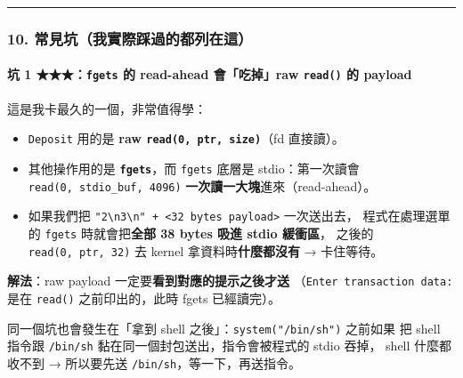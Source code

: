 \documentclass[10pt,a4paper]{article}
\providecommand{\tightlist}{%
  \setlength{\itemsep}{0pt}\setlength{\parskip}{0pt}}
\begin{document}
\begin{center}\rule{0.5\linewidth}{0.5pt}\end{center}

\subsubsection{10.
常見坑（我實際踩過的都列在這）}\label{ux5e38ux898bux5751ux6211ux5be6ux969bux8e29ux904eux7684ux90fdux5217ux5728ux9019}

\paragraph{\texorpdfstring{坑 1 ★★★：\texttt{fgets} 的 read-ahead
會「吃掉」raw \texttt{read()} 的
payload}{坑 1 ★★★：fgets 的 read-ahead 會「吃掉」raw read() 的 payload}}\label{ux5751-1-fgets-ux7684-read-ahead-ux6703ux5403ux6389raw-read-ux7684-payload}

這是我卡最久的一個，非常值得學：

\begin{itemize}
\tightlist
\item
  \texttt{Deposit} 用的是 \textbf{raw \texttt{read(0,\allowbreak{}\ \allowbreak{}ptr,\allowbreak{}\ \allowbreak{}size)}}（fd
  直接讀）。
\item
  其他操作用的是 \textbf{\texttt{fgets}}，而 \texttt{fgets} 底層是
  stdio：第一次讀會 \texttt{read(0,\allowbreak{}\ \allowbreak{}stdio\_\allowbreak{}buf,\allowbreak{}\ \allowbreak{}4096)}
  \textbf{一次讀一大塊}進來（read-ahead）。
\item
  如果我們把
  \texttt{"2\textbackslash{}\allowbreak{}n3\textbackslash{}\allowbreak{}n"\ \allowbreak{}+\ \allowbreak{}\textless{}\allowbreak{}32\ \allowbreak{}bytes\ \allowbreak{}payload\textgreater{}\allowbreak{}}
  一次送出去， 程式在處理選單的 \texttt{fgets} 時就會把\textbf{全部 38
  bytes 吸進 stdio 緩衝區}， 之後的 \texttt{read(0,\allowbreak{}\ \allowbreak{}ptr,\allowbreak{}\ \allowbreak{}32)} 去
  kernel 拿資料時\textbf{什麼都沒有} → 卡住等待。
\end{itemize}

\textbf{解法}：raw payload 一定要\textbf{看到對應的提示之後才送}
（\texttt{Enter\ \allowbreak{}transaction\ \allowbreak{}data:} 是在 \texttt{read()}
之前印出的，此時 fgets 已經讀完）。

同一個坑也會發生在「拿到 shell 之後」：\texttt{system("/\allowbreak{}bin/\allowbreak{}sh")}
之前如果 把 shell 指令跟 \texttt{/\allowbreak{}bin/\allowbreak{}sh}
黏在同一個封包送出，指令會被程式的 stdio 吞掉， shell 什麼都收不到 →
所以要先送 \texttt{/\allowbreak{}bin/\allowbreak{}sh}，等一下，再送指令。
\end{document}

